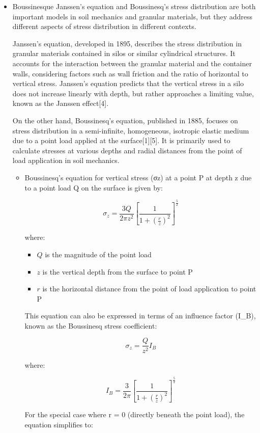 \documentclass[xcolor=dvipsnames,10pt,hidelinks]{article}
\begin{document}
\begin{itemize}
\begin{itemize}
\item Boussinesque
Janssen's equation and Boussinesq's stress distribution are both important models in soil mechanics and granular materials, but they address different aspects of stress distribution in different contexts.

Janssen's equation, developed in 1895, describes the stress distribution in granular materials contained in silos or similar cylindrical structures. It accounts for the interaction between the granular material and the container walls, considering factors such as wall friction and the ratio of horizontal to vertical stress. Janssen's equation predicts that the vertical stress in a silo does not increase linearly with depth, but rather approaches a limiting value, known as the Janssen effect[4].

On the other hand, Boussinesq's equation, published in 1885, focuses on stress distribution in a semi-infinite, homogeneous, isotropic elastic medium due to a point load applied at the surface[1][5]. It is primarily used to calculate stresses at various depths and radial distances from the point of load application in soil mechanics.

\begin{itemize}
\item Boussinesq's equation for vertical stress (σz) at a point P at depth z due to a point load Q on the surface is given by:

$$ \sigma_z = \frac{3Q}{2\pi z^2} \left[ \frac{1}{1+\left(\frac{r}{z}\right)^2} \right]^{\frac{5}{2}} $$

where:
\begin{itemize}
\item \(Q\) is the magnitude of the point load
\item \(z\) is the vertical depth from the surface to point P
\item \(r\) is the horizontal distance from the point of load application to point P
\end{itemize}

This equation can also be expressed in terms of an influence factor (I\_B), known as the Boussinesq stress coefficient:

$$ \sigma_z = \frac{Q}{z^2} I_B $$

where:

$$ I_B = \frac{3}{2\pi} \left[ \frac{1}{1+\left(\frac{r}{z}\right)^2} \right]^{\frac{5}{2}} $$

For the special case where r = 0 (directly beneath the point load), the equation simplifies to:


\end{itemize}
\end{itemize}
\end{itemize}
\end{document}
